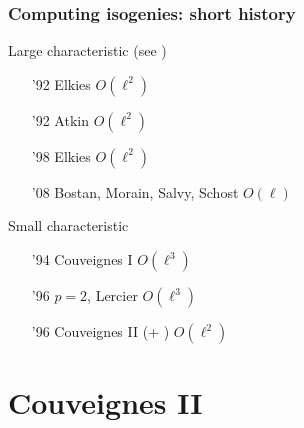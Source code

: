 \documentclass[10pt]{beamer}
\newcommand{\0}{\mathcal{O}}  %
\begin{document}

\begin{frame}
  \frametitle{Computing isogenies: short history}
  
  \begin{block}{Large characteristic (see \cite{BoMoSaSc08})}
    \begin{itemize}
    \item['92] Elkies \hfill $O(\ell^2)$
    \item['92] Atkin \hfill $O(\ell^2)$
    \item['98] Elkies \hfill $O(\ell^2)$
    \item['08] Bostan, Morain, Salvy, Schost \hfill $O(\ell)$
    \end{itemize}
  \end{block}

  \begin{block}{Small characteristic}
    \begin{itemize}
    \item['94] Couveignes I \hfill $O(\ell^3)$
    \item['96] $p=2$, Lercier \hfill $O(\ell^3)$
    \item['96] Couveignes II (+ \cite{DF07}) \hfill $O(\ell^2)$
    \end{itemize}
  \end{block}
\end{frame}


\section{Couveignes II}
\end{document}
